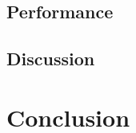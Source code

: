 \documentclass[english,10pt]{llncs}
\begin{document}
\subsection{Performance}






\subsection{Discussion}


\section{Conclusion}




\end{document}
